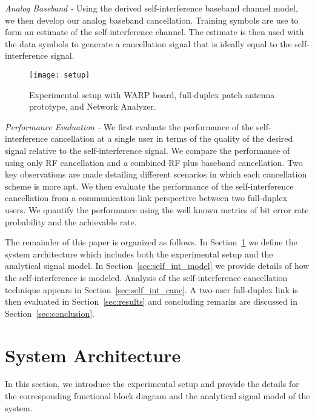 \documentclass[12pt, journal,draftcls,letterpaper,onecolumn]{IEEEtran}
\begin{document}
\emph{Analog Baseband -} Using the derived self-interference baseband channel model, we then develop our analog baseband cancellation.  Training symbols are use to form an estimate of the self-interference channel.  The estimate is then used with the data symbols to generate a cancellation signal that is ideally equal to the self-interference signal.  
\begin{figure}[htp] 
\begin{center}  
  \texttt{[image: setup]} 
\caption[fig:system]{Experimental setup with WARP board, full-duplex patch antenna prototype, and Network Analyzer.  }   
  \label{fig:setup} 
\end{center}  
\end{figure} 

\emph{Performance Evaluation -} We first evaluate the performance of the self-interference cancellation at a single user in terms of the quality of the desired signal relative to the self-interference signal.  We compare the performance of using only RF cancellation and a combined RF plus baseband cancellation.  Two key observations are made detailing different scenarios in which each cancellation scheme is more apt.  We then evaluate the performance of the self-interference cancellation from a communication link perspective between two full-duplex users.  We quantify the performance using the well known metrics of bit error rate probability and the achievable rate.  

The remainder of this paper is organized as follows.  In Section~\ref{sec:system_architecture} we define the system architecture which includes both the experimental setup and the analytical signal model.  In Section~\ref{sec:self_int_model} we provide details of how the self-interference is modeled.  Analysis of the self-interference cancellation technique appears in Section~\ref{sec:self_int_canc}.  A two-user full-duplex link is then evaluated in Section~\ref{sec:results} and concluding remarks are discussed in Section~\ref{sec:conclusion}.

\section{System Architecture}
\label{sec:system_architecture}
In this section, we introduce the experimental setup and provide the details for the corresponding functional block diagram and the analytical signal model of the system.  
\end{document}
